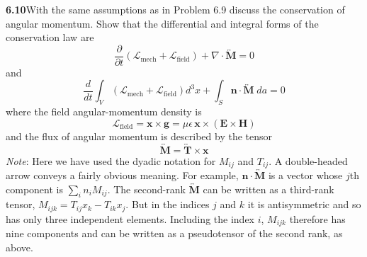 \par\bigskip
\noindent\textbf{6.10}\quad With the same assumptions as in Problem 6.9 discuss the conservation of angular momentum. Show that the differential and integral forms of the conservation law are
\[
\frac{\partial}{\partial t}\left(\mathcal{L}_{\mathrm{mech}}+\mathcal{L}_{\mathrm{field}}\right)+\nabla\cdot\overleftrightarrow{\mathbf{M}}=0
\]
and
\[
\frac{d}{dt}\int_{V}\left(\mathcal{L}_{\mathrm{mech}}+\mathcal{L}_{\mathrm{field}}\right)d^{3}x+\int_{S}\mathbf{n}\cdot\overleftrightarrow{\mathbf{M}}\;da=0
\]
where the field angular-momentum density is
\[
\mathcal{L}_{\mathrm{field}}=\mathbf{x}\times\mathbf{g}=\mu\epsilon\,\mathbf{x}\times(\mathbf{E}\times\mathbf{H})
\]
and the flux of angular momentum is described by the tensor
\[
\overleftrightarrow{\mathbf{M}}=\overleftrightarrow{\mathbf{T}}\times\mathbf{x}
\]
\emph{Note}: Here we have used the dyadic notation for $M_{ij}$ and $T_{ij}$. A double-headed arrow conveys a fairly obvious meaning. For example, $\mathbf{n}\cdot\overleftrightarrow{\mathbf{M}}$ is a vector whose $j$th component is $\sum_{i}n_{i}M_{ij}$. The second-rank $\overleftrightarrow{\mathbf{M}}$ can be written as a third-rank tensor, $M_{ijk}=T_{ij}x_{k}-T_{ik}x_{j}$. But in the indices $j$ and $k$ it is antisymmetric and so has only three independent elements. Including the index $i$, $M_{ijk}$ therefore has nine components and can be written as a pseudotensor of the second rank, as above.
\solution

